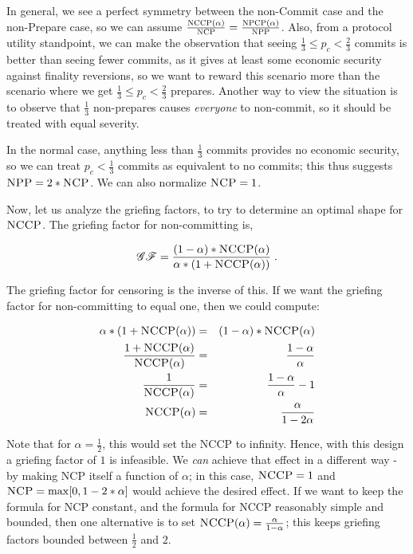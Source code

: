 \documentclass[12pt, final]{article}
\newcommand{\NCP}{\textsc{NCP}\xspace}
\newcommand{\NCCP}{\textsc{NCCP}\xspace}
\newcommand{\NPP}{\textsc{NPP}\xspace}
\newcommand{\NPCP}{\textsc{NPCP}\xspace}
\begin{document}
In general, we see a perfect symmetry between the non-Commit case and the non-Prepare case, so we can assume $\frac{\NCCP(\alpha)}{\NCP} = \frac{\NPCP(\alpha)}{\NPP}$. Also, from a protocol utility standpoint, we can make the observation that seeing $\frac{1}{3} \le p_c < \frac{2}{3}$ commits is better than seeing fewer commits, as it gives at least some economic security against finality reversions, so we want to reward this scenario more than the scenario where we get $\frac{1}{3} \le p_c < \frac{2}{3}$ prepares. Another way to view the situation is to observe that $\frac{1}{3}$ non-prepares causes \emph{everyone} to non-commit, so it should be treated with equal severity.

In the normal case, anything less than $\frac{1}{3}$ commits provides no economic security, so we can treat $p_c < \frac{1}{3}$ commits as equivalent to no commits; this thus suggests $\NPP = 2 * \NCP$. We can also normalize $\NCP = 1$.

Now, let us analyze the griefing factors, to try to determine an optimal shape for $\NCCP$. The griefing factor for non-committing is,

\begin{equation}
\mathscr{GF} = \frac{(1-\alpha) * \NCCP(\alpha)}{\alpha * (1 + \NCCP(\alpha))} \; .
\end{equation}

The griefing factor for censoring is the inverse of this. If we want the griefing factor for non-committing to equal one, then we could compute:

\begin{eqnarray}
\alpha * (1 + \NCCP(\alpha)) &=& (1-\alpha) * \NCCP(\alpha) \\
\frac{1 + \NCCP(\alpha)}{\NCCP(\alpha)} &=& \frac{1-\alpha}{\alpha} \\
\frac{1}{\NCCP(\alpha)} &=& \frac{1-\alpha}{\alpha} - 1 \\
\NCCP(\alpha) &=& \frac{\alpha}{1-2\alpha}
\end{eqnarray}

Note that for $\alpha = \frac{1}{2}$, this would set the \NCCP to infinity. Hence, with this design a griefing factor of $1$ is infeasible. We \emph{can} achieve that effect in a different way - by making \NCP itself a function of $\alpha$; in this case, $\NCCP = 1$ and $\NCP = \max[0, 1 - 2 * \alpha]$ would achieve the desired effect. If we want to keep the formula for \NCP constant, and the formula for \NCCP reasonably simple and bounded, then one alternative is to set $\NCCP(\alpha) = \frac{\alpha}{1-\alpha}$; this keeps griefing factors bounded between $\frac{1}{2}$ and $2$.
\end{document}
